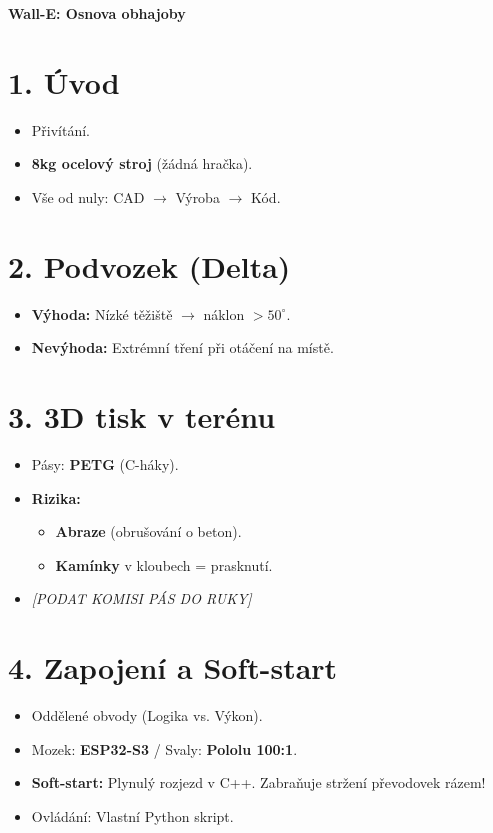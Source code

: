 \documentclass[12pt,a4paper]{article}
\begin{document}
\thispagestyle{empty}

\begin{center}
\Huge \textbf{Wall-E: Osnova obhajoby}
\end{center}
\vspace{1em}

\Large

\section*{1. Úvod}
\begin{itemize}[itemsep=0.5em, label=$\rightarrow$]
    \item Přivítání.
    \item \textbf{8kg ocelový stroj} (žádná hračka).
    \item Vše od nuly: CAD $\rightarrow$ Výroba $\rightarrow$ Kód.
\end{itemize}

\section*{2. Podvozek (Delta)}
\begin{itemize}[itemsep=0.5em, label=$\rightarrow$]
    \item \textbf{Výhoda:} Nízké těžiště $\rightarrow$ náklon \textbf{$> 50^\circ$}.
    \item \textbf{Nevýhoda:} Extrémní tření při otáčení na místě.
\end{itemize}

\section*{3. 3D tisk v terénu}
\begin{itemize}[itemsep=0.5em, label=$\rightarrow$]
    \item Pásy: \textbf{PETG} (C-háky).
    \item \textbf{Rizika:} 
        \begin{itemize}
            \item \textbf{Abraze} (obrušování o beton).
            \item \textbf{Kamínky} v kloubech = prasknutí.
        \end{itemize}
    \item \textit{[PODAT KOMISI PÁS DO RUKY]}
\end{itemize}

\section*{4. Zapojení a Soft-start}
\begin{itemize}[itemsep=0.5em, label=$\rightarrow$]
    \item Oddělené obvody (Logika vs. Výkon).
    \item Mozek: \textbf{ESP32-S3} / Svaly: \textbf{Pololu 100:1}.
    \item \textbf{Soft-start:} Plynulý rozjezd v C++. Zabraňuje stržení převodovek rázem!
    \item Ovládání: Vlastní Python skript.
\end{itemize}
\end{document}
